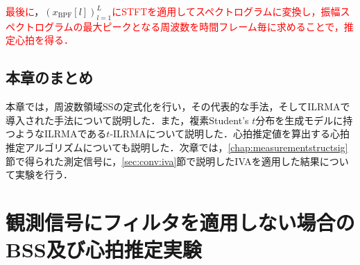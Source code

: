 \textcolor{red}{最後に}，$\left(x_{\mathrm{BPF}}[l]\right)_{l=1}^{L}$\textcolor{red}{にSTFTを適用してスペクトログラムに変換し，振幅スペクトログラムの最大ピークとなる周波数を時間フレーム毎に求めることで，推定心拍を得る．}

\section{本章のまとめ}
本章では，周波数領域SSの定式化を行い，その代表的な手法，そしてILRMAで導入された手法について説明した．また，複素Student's $t$分布を生成モデルに持つようなILRMAである$t$-ILRMAについて説明した．心拍推定値を算出する心拍推定アルゴリズムについても説明した．次章では，\ref{chap:measurementstructsig}節で得られた測定信号に，\ref{sec:conv:iva}節で説明したIVAを適用した結果について実験を行う．

\chapter{観測信号にフィルタを適用しない場合のBSS及び心拍推定実験}
\label{chap:bsshrexp}

